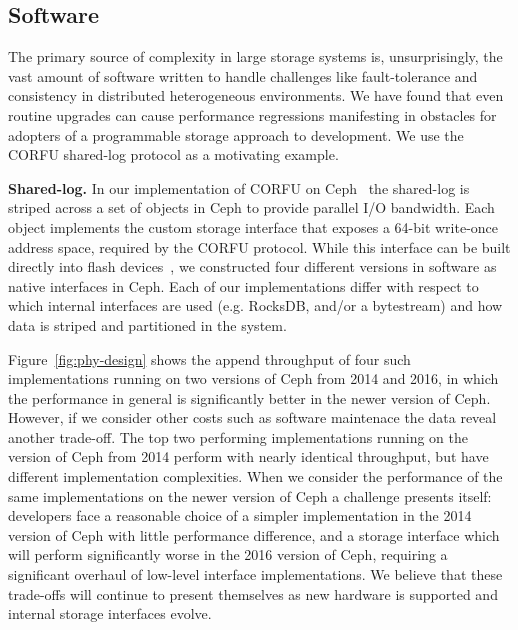 \subsection{Software}
\label{software}

The primary source of complexity in large storage systems is, unsurprisingly,
the vast amount of software written to handle challenges like fault-tolerance
and consistency in distributed heterogeneous environments. We have found that
even routine upgrades can cause performance regressions manifesting in obstacles 
for adopters of a programmable storage approach to development. We use the
CORFU shared-log protocol as a motivating example.

{\bf Shared-log.} In our implementation of CORFU on Ceph~\cite{zlog} the shared-log is striped
across a set of objects in Ceph to provide parallel I/O bandwidth. Each object
implements the custom storage interface that exposes a 64-bit write-once address
space, required by the CORFU protocol.  While this interface can be
built directly into flash devices~\cite{wei:systor13}, we constructed four
different versions in software as native interfaces in Ceph. Each of our
implementations differ with respect to which internal interfaces are used
(e.g. RocksDB, and/or a bytestream) and how data is striped and partitioned in the system.

Figure~\ref{fig:phy-design} shows the append throughput of four such
implementations running on two versions of Ceph from 2014 and 2016, in which
the performance in general is significantly better in the newer version of
Ceph. However, if we consider other costs such as software maintenace the data
reveal another trade-off. The top two performing implementations running on
the version of Ceph from 2014 perform with nearly identical throughput, but
have different implementation complexities. When we consider the performance
of the same implementations on the newer version of Ceph a challenge presents
itself: developers face a reasonable choice of a simpler implementation in the
2014 version of Ceph with little performance difference, and a storage
interface which will perform significantly worse in the 2016 version of Ceph,
requiring a significant overhaul of low-level interface implementations. We
believe that these trade-offs will continue to present themselves as new
hardware is supported and internal storage interfaces evolve.

